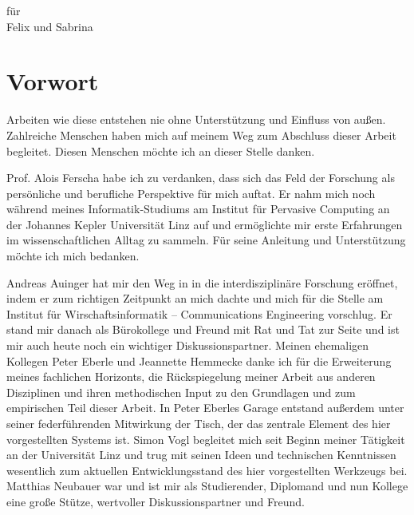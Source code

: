\vspace*{\fill}

\begin{center}
\Large
für \\
Felix und Sabrina
\end{center}

\vspace*{\fill}

\cleardoublepage

\section*{Vorwort} %
\label{sec:vorwort}

Arbeiten wie diese entstehen nie ohne Unterstützung und Einfluss von außen. Zahlreiche Menschen haben mich auf meinem Weg zum Abschluss dieser Arbeit begleitet. Diesen Menschen möchte ich an dieser Stelle danken.

Prof. Alois Ferscha habe ich zu verdanken, dass sich das Feld der Forschung als persönliche und berufliche Perspektive für mich auftat. Er nahm mich noch während meines Informatik-Studiums am Institut für Pervasive Computing an der Johannes Kepler Universität Linz auf und ermöglichte mir erste Erfahrungen im wissenschaftlichen Alltag zu sammeln. Für seine Anleitung und Unterstützung möchte ich mich bedanken.

Andreas Auinger hat mir den Weg in in die interdisziplinäre Forschung eröffnet, indem er zum richtigen Zeitpunkt an mich dachte und mich für die Stelle am Institut für Wirschaftsinformatik -- Communications Engineering vorschlug. Er stand mir danach als Bürokollege und Freund mit Rat und Tat zur Seite und ist mir auch heute noch ein wichtiger Diskussionspartner. Meinen ehemaligen Kollegen Peter Eberle und Jeannette Hemmecke danke ich für die Erweiterung meines fachlichen Horizonts, die Rückspiegelung meiner Arbeit aus anderen Disziplinen und ihren methodischen Input zu den Grundlagen und zum empirischen Teil dieser Arbeit. In Peter Eberles Garage entstand außerdem unter seiner federführenden Mitwirkung der Tisch, der das zentrale Element des hier vorgestellten Systems ist. Simon Vogl begleitet mich seit Beginn meiner Tätigkeit an der Universität Linz und trug mit seinen Ideen und technischen Kenntnissen wesentlich zum aktuellen Entwicklungsstand des hier vorgestellten Werkzeugs bei. Matthias Neubauer war und ist mir als Studierender, Diplomand und nun Kollege eine große Stütze, wertvoller Diskussionspartner und Freund. 

